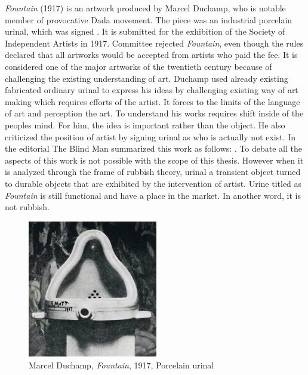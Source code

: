 \textit{Fountain} (1917) is an artwork produced by Marcel Duchamp, who is notable member of provocative Dada movement. The piece was an industrial porcelain urinal, which was signed . It is submitted for the exhibition of the Society of Independent Artists in 1917. Committee rejected \textit{Fountain}, even though the rules declared that all artworks would be accepted from artists who paid the fee. It is considered one of the major artworks of the twentieth century because of challenging the existing understanding of art. Duchamp used already existing fabricated ordinary urinal to express his ideas by challenging existing way of art making which requires efforts of the artist. It forces to the limits of the language of art and perception the art. To understand his works requires shift inside of the peoples mind. For him, the idea is important rather than the object. He also criticized the position of artist by signing urinal as  who is actually not exist. In the editorial The Blind Man summarized this work as follows:  \citep{duchamp1917mutt}. To debate all the aspects of this work is not possible with the scope of this thesis. However when it is analyzed through the frame of rubbish theory, urinal a transient object turned to durable objects that are exhibited by the intervention of artist. Urine titled as \textit{Fountain} is still functional and have a place in the market. In another word, it is not rubbish.

\begin{figure}[h!]
  \centering
  \includegraphics[height=6cm]{graphics/Duchamp_Fountaine.jpg}
  \caption{Marcel Duchamp, \textit{Fountain}, 1917, Porcelain urinal}
  \label{fig:Duchamp_Fountaine}
\end{figure}



